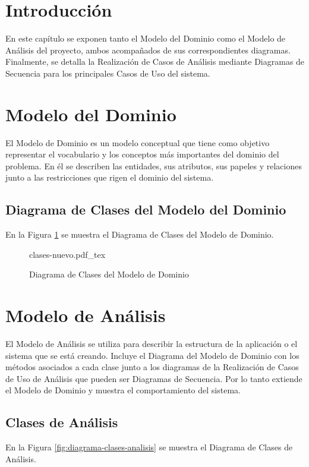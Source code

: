 \section{Introducción}
En este capítulo se exponen tanto el Modelo del Dominio como el Modelo de Análisis del proyecto, ambos acompañados de sus correspondientes diagramas. Finalmente, se detalla la Realización de Casos de Análisis mediante Diagramas de Secuencia para los principales Casos de Uso del sistema. 

\section{Modelo del Dominio}
El Modelo de Dominio \cite{modelo-dominio} es un modelo conceptual que tiene como objetivo representar el vocabulario y los conceptos más importantes del dominio del problema. En él se describen las entidades, sus atributos, sus papeles y relaciones junto a las restricciones que rigen el dominio del sistema. 

\subsection{Diagrama de Clases del Modelo del Dominio}
\label{sec:clases}
En la Figura \ref{fig:diagrama-clases}  se muestra el Diagrama de Clases del Modelo de Dominio.

\begin{figure}
    \centering
    \begin{normalsize}
        {clases-nuevo.pdf_tex}
    \end{normalsize}
    \caption{Diagrama de Clases del Modelo de Dominio}
     \label{fig:diagrama-clases}
 
 \end{figure}

\section{Modelo de Análisis}
El Modelo de Análisis \cite{modelo-analisis} se utiliza para describir la estructura de la aplicación o el sistema que se está creando. Incluye el Diagrama del Modelo de Dominio con los métodos asociados a cada clase junto a los diagramas de la Realización de Casos de Uso de Análisis que pueden ser Diagramas de Secuencia. Por lo tanto extiende el Modelo de Dominio y muestra el comportamiento del sistema.

\subsection{Clases de Análisis}
En la Figura \ref{fig:diagrama-clases-analisis}  se muestra el Diagrama de Clases de Análisis.

